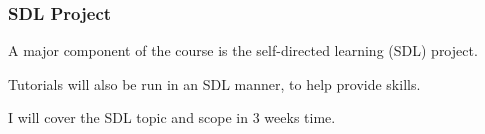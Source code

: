 
\begin{frame}\frametitle{SDL Project}
	A major component of the course is the self-directed learning (SDL) project. 
	
	\vspace{12pt}
	Tutorials will also be run in an SDL manner, to help provide skills.
	
	\vspace{12pt}
	I will cover the SDL topic and scope in 3 weeks time.
\end{frame}

